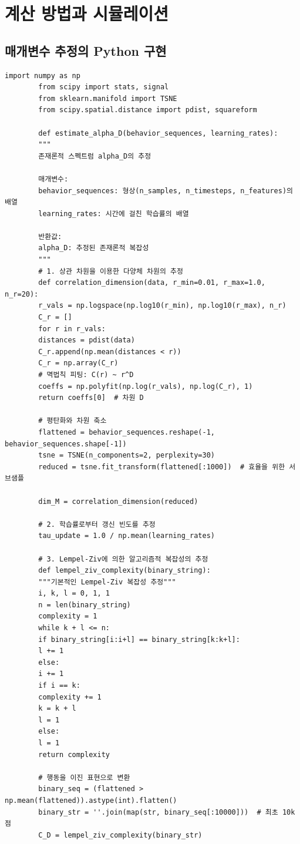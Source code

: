 \documentclass[11pt,a4paper]{article}
\begin{document}
	\section{계산 방법과 시뮬레이션}
	
	\subsection{매개변수 추정의 Python 구현}
	
	\begin{lstlisting}[caption={시계열 데이터로부터 UCD 매개변수를 추정하는 Python 코드}, label={lst:ucd-python}]
		import numpy as np
		from scipy import stats, signal
		from sklearn.manifold import TSNE
		from scipy.spatial.distance import pdist, squareform
		
		def estimate_alpha_D(behavior_sequences, learning_rates):
		"""
		존재론적 스펙트럼 alpha_D의 추정
		
		매개변수:
		behavior_sequences: 형상(n_samples, n_timesteps, n_features)의 배열
		learning_rates: 시간에 걸친 학습률의 배열
		
		반환값:
		alpha_D: 추정된 존재론적 복잡성
		"""
		# 1. 상관 차원을 이용한 다양체 차원의 추정
		def correlation_dimension(data, r_min=0.01, r_max=1.0, n_r=20):
		r_vals = np.logspace(np.log10(r_min), np.log10(r_max), n_r)
		C_r = []
		for r in r_vals:
		distances = pdist(data)
		C_r.append(np.mean(distances < r))
		C_r = np.array(C_r)
		# 멱법칙 피팅: C(r) ~ r^D
		coeffs = np.polyfit(np.log(r_vals), np.log(C_r), 1)
		return coeffs[0]  # 차원 D
		
		# 평탄화와 차원 축소
		flattened = behavior_sequences.reshape(-1, behavior_sequences.shape[-1])
		tsne = TSNE(n_components=2, perplexity=30)
		reduced = tsne.fit_transform(flattened[:1000])  # 효율을 위한 서브샘플
		
		dim_M = correlation_dimension(reduced)
		
		# 2. 학습률로부터 갱신 빈도를 추정
		tau_update = 1.0 / np.mean(learning_rates)
		
		# 3. Lempel-Ziv에 의한 알고리즘적 복잡성의 추정
		def lempel_ziv_complexity(binary_string):
		"""기본적인 Lempel-Ziv 복잡성 추정"""
		i, k, l = 0, 1, 1
		n = len(binary_string)
		complexity = 1
		while k + l <= n:
		if binary_string[i:i+l] == binary_string[k:k+l]:
		l += 1
		else:
		i += 1
		if i == k:
		complexity += 1
		k = k + l
		l = 1
		else:
		l = 1
		return complexity
		
		# 행동을 이진 표현으로 변환
		binary_seq = (flattened > np.mean(flattened)).astype(int).flatten()
		binary_str = ''.join(map(str, binary_seq[:10000]))  # 최초 10k 점
		C_D = lempel_ziv_complexity(binary_str)
		

\end{lstlisting}
\end{document}
